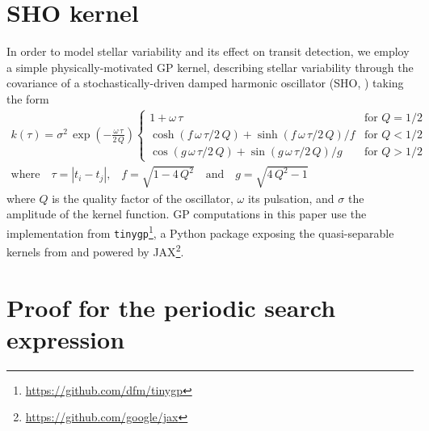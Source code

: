\documentclass[modern,linenumbers]{aastex631}
\begin{document}
\section{SHO kernel}\label{app_gp}
In order to model stellar variability and its effect on transit detection, we employ a simple physically-motivated GP kernel, describing stellar variability through the covariance of a stochastically-driven damped harmonic oscillator (SHO, \citealt{celerite, celerite2}) taking the form 
\begin{equation}
    \begin{gathered}
        k(\tau) = \sigma^2\,\exp\left(-\frac{\omega\,\tau}{2\,Q}\right)
        \left\{\begin{array}{ll}
            1 + \omega\,\tau & \mbox{for } Q = 1/2 \\
            \cosh(f\,\omega\,\tau/2\,Q) + \sinh(f\,\omega\,\tau/2\,Q)/f
                & \mbox{for } Q < 1/2 \\
            \cos(g\,\omega\,\tau/2\,Q) + \sin(g\,\omega\,\tau/2\,Q)/g
                & \mbox{for } Q > 1/2
        \end{array}\right. \\
        \text{where}\quad \tau = |t_i - t_j|\text{,}\quad f = \sqrt{1 - 4\,Q^2} \quad \text{and}\quad g = \sqrt{4\,Q^2 - 1}
    \end{gathered}
\end{equation}
where $Q$ is the quality factor of the oscillator, $\omega$ its pulsation, and $\sigma$ the amplitude of the kernel function. GP computations in this paper use the implementation from \texttt{tinygp}\footnote{\href{https://github.com/dfm/tinygp}{https://github.com/dfm/tinygp}}, a Python package exposing the quasi-separable kernels from \cite{celerite2} and powered by \textsf{JAX}\footnote{\href{https://github.com/google/jax}{https://github.com/google/jax}}.

\section{Proof for the periodic search expression}\label{proof}
\end{document}
